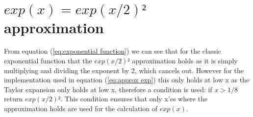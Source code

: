 \documentclass[12pt,a4paper]{article}
\begin{document}
\section{$exp(x)=exp(x/2)²$ approximation}
From equation (\ref{eq:exponential function}) we can see that for the classic exponential function that the $exp(x/2)²$ approximation holds as it is simply multiplying and dividing the exponent by 2, which cancels out. However for the implementation used in equation (\ref{eq:approx exp}) this only holds at low x as the Taylor expansion only holds at low x, therefore a condition is used: if $x>1/8$ return $exp(x/2)²$.
This condition ensures that only x'es where the approximation holds are used for the calculation of $exp(x)$.
\end{document}
